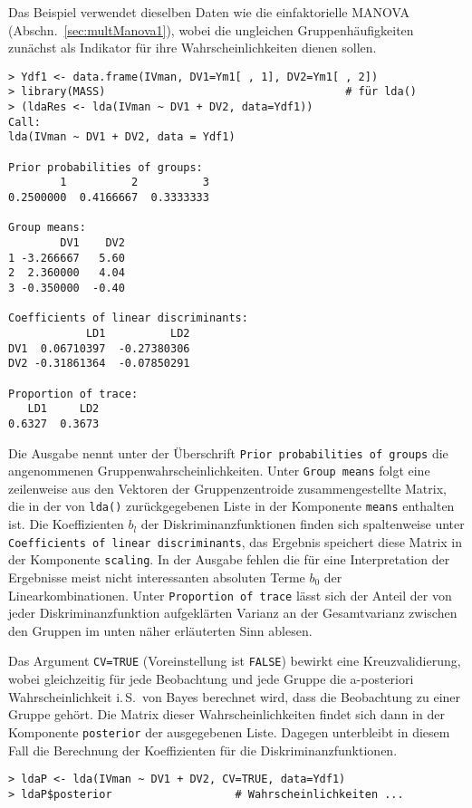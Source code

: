 Das Beispiel verwendet dieselben Daten wie die einfaktorielle MANOVA (Abschn.\ \ref{sec:multManova1}), wobei die ungleichen Gruppenhäufigkeiten zunächst als Indikator für ihre Wahrscheinlichkeiten dienen sollen.
\begin{lstlisting}
> Ydf1 <- data.frame(IVman, DV1=Ym1[ , 1], DV2=Ym1[ , 2])
> library(MASS)                                     # für lda()
> (ldaRes <- lda(IVman ~ DV1 + DV2, data=Ydf1))
Call:
lda(IVman ~ DV1 + DV2, data = Ydf1)

Prior probabilities of groups:
        1          2          3
0.2500000  0.4166667  0.3333333

Group means:
        DV1    DV2
1 -3.266667   5.60
2  2.360000   4.04
3 -0.350000  -0.40

Coefficients of linear discriminants:
            LD1          LD2
DV1  0.06710397  -0.27380306
DV2 -0.31861364  -0.07850291

Proportion of trace:
   LD1     LD2
0.6327  0.3673
\end{lstlisting}

Die Ausgabe nennt unter der Überschrift \lstinline!Prior probabilities of groups! die angenommenen Gruppenwahrscheinlichkeiten. Unter \lstinline!Group means! folgt eine zeilenweise aus den Vektoren der Gruppenzentroide zusammengestellte Matrix, die in der von \lstinline!lda()! zurückgegebenen Liste in der Komponente \lstinline!means! enthalten ist. Die Koeffizienten $b_{l}$ der Diskriminanzfunktionen finden sich spaltenweise unter \lstinline!Coefficients of linear discriminants!, das Ergebnis speichert diese Matrix in der Komponente \lstinline!scaling!. In der Ausgabe fehlen die für eine Interpretation der Ergebnisse meist nicht interessanten absoluten Terme $b_{0}$ der Linearkombinationen. Unter \lstinline!Proportion of trace! lässt sich der Anteil der von jeder Diskriminanzfunktion aufgeklärten Varianz an der Gesamtvarianz zwischen den Gruppen im unten näher erläuterten Sinn ablesen.

Das Argument \lstinline!CV=TRUE! (Voreinstellung ist \lstinline!FALSE!) bewirkt eine Kreuzvalidierung, wobei gleichzeitig für jede Beobachtung und jede Gruppe die a-posteriori Wahrscheinlichkeit i.\,S.\ von Bayes berechnet wird, dass die Beobachtung zu einer Gruppe gehört. Die Matrix dieser Wahrscheinlichkeiten findet sich dann in der Komponente \lstinline!posterior! der ausgegebenen Liste. Dagegen unterbleibt in diesem Fall die Berechnung der Koeffizienten für die Diskriminanzfunktionen.
\begin{lstlisting}
> ldaP <- lda(IVman ~ DV1 + DV2, CV=TRUE, data=Ydf1)
> ldaP$posterior                   # Wahrscheinlichkeiten ...
\end{lstlisting}

